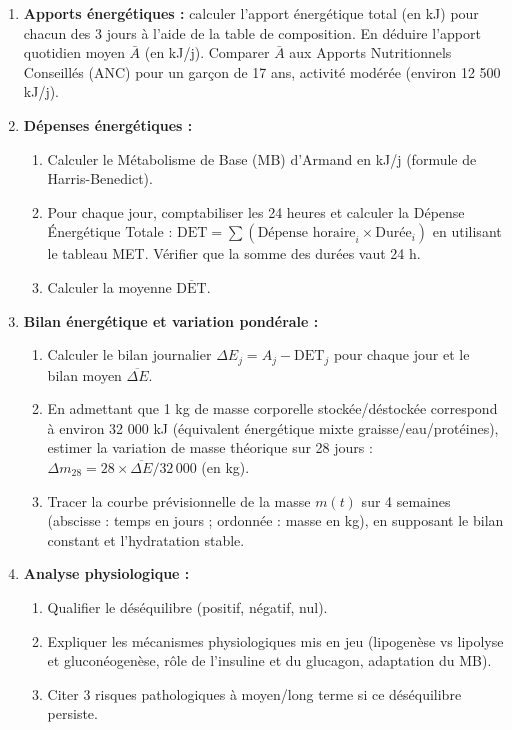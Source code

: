 \documentclass[11pt]{article}
\begin{document}
\begin{enumerate}
    \item \textbf{Apports énergétiques :} calculer l'apport énergétique total (en kJ) pour chacun des 3 jours à l'aide de la table de composition. En déduire l'apport quotidien moyen $\bar{A}$ (en kJ/j). Comparer $\bar{A}$ aux Apports Nutritionnels Conseillés (ANC) pour un garçon de 17 ans, activité modérée (environ 12 500 kJ/j).
    \item \textbf{Dépenses énergétiques :}
    \begin{enumerate}
        \item Calculer le Métabolisme de Base (MB) d'Armand en kJ/j (formule de Harris-Benedict).
        \item Pour chaque jour, comptabiliser les 24 heures et calculer la Dépense Énergétique Totale : $\text{DET} = \sum (\text{Dépense horaire}_i \times \text{Durée}_i)$ en utilisant le tableau MET. Vérifier que la somme des durées vaut 24 h.
        \item Calculer la moyenne $\overline{\text{DET}}$.
    \end{enumerate}
    \item \textbf{Bilan énergétique et variation pondérale :}
    \begin{enumerate}
        \item Calculer le bilan journalier $\Delta E_j = A_j - \text{DET}_j$ pour chaque jour et le bilan moyen $\overline{\Delta E}$.
        \item En admettant que 1 kg de masse corporelle stockée/déstockée correspond à environ 32 000 kJ (équivalent énergétique mixte graisse/eau/protéines), estimer la variation de masse théorique sur 28 jours : $\Delta m_{28} = 28 \times \overline{\Delta E} / 32\,000$ (en kg).
        \item Tracer la courbe prévisionnelle de la masse $m(t)$ sur 4 semaines (abscisse : temps en jours ; ordonnée : masse en kg), en supposant le bilan constant et l'hydratation stable.
    \end{enumerate}
    \item \textbf{Analyse physiologique :}
    \begin{enumerate}
        \item Qualifier le déséquilibre (positif, négatif, nul).
        \item Expliquer les mécanismes physiologiques mis en jeu (lipogenèse vs lipolyse et gluconéogenèse, rôle de l'insuline et du glucagon, adaptation du MB).
        \item Citer 3 risques pathologiques à moyen/long terme si ce déséquilibre persiste.

\end{enumerate}
\end{enumerate}
\end{document}
